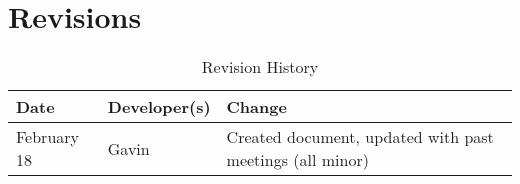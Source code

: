 \documentclass{article}
\begin{document}
\newpage

\section{Revisions}

\begin{table}[hp]
\caption{Revision History} \label{tbl:rev}
\begin{tabularx}{\textwidth}{llX}
\toprule
\textbf{Date} & \textbf{Developer(s)} & \textbf{Change}\\
\midrule
February 18 & Gavin & Created document, updated with past meetings (all minor) \\
\bottomrule
\end{tabularx}
\end{table}
\end{document}
